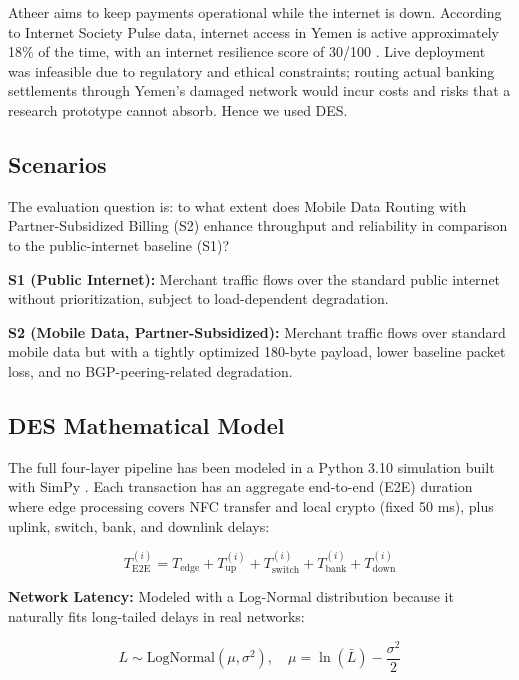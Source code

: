 \documentclass[conference,10pt]{IEEEtran}
\begin{document}
Atheer aims to keep payments operational while the internet is down. According to Internet Society Pulse data, internet access in Yemen is active approximately 18\% of the time, with an internet resilience score of 30/100 \cite{isoc2024, ookla2024}. Live deployment was infeasible due to regulatory and ethical constraints; routing actual banking settlements through Yemen's damaged network would incur costs and risks that a research prototype cannot absorb. Hence we used DES.

\subsection{Scenarios}

The evaluation question is: to what extent does Mobile Data Routing with Partner-Subsidized Billing (S2) enhance throughput and reliability in comparison to the public-internet baseline (S1)?

\textbf{S1 (Public Internet):} Merchant traffic flows over the standard public internet without prioritization, subject to load-dependent degradation.

\textbf{S2 (Mobile Data, Partner-Subsidized):} Merchant traffic flows over standard mobile data but with a tightly optimized 180-byte payload, lower baseline packet loss, and no BGP-peering-related degradation.

\subsection{DES Mathematical Model}

The full four-layer pipeline has been modeled in a Python 3.10 simulation built with SimPy \cite{mutawakel2024}. Each transaction has an aggregate end-to-end (E2E) duration where edge processing covers NFC transfer and local crypto (fixed 50 ms), plus uplink, switch, bank, and downlink delays:

\begin{equation}
T^{(i)}_{\mathrm{E2E}} = T_{\mathrm{edge}} + T^{(i)}_{\mathrm{up}} + T^{(i)}_{\mathrm{switch}} + T^{(i)}_{\mathrm{bank}} + T^{(i)}_{\mathrm{down}}
\label{eq:e2e}
\end{equation}

\textbf{Network Latency:} Modeled with a Log-Normal distribution because it naturally fits long-tailed delays in real networks:

\begin{equation}
L \sim \mathrm{LogNormal}(\mu, \sigma^2), \quad \mu = \ln(\bar{L}) - \frac{\sigma^2}{2}
\label{eq:lognormal}
\end{equation}
\end{document}
